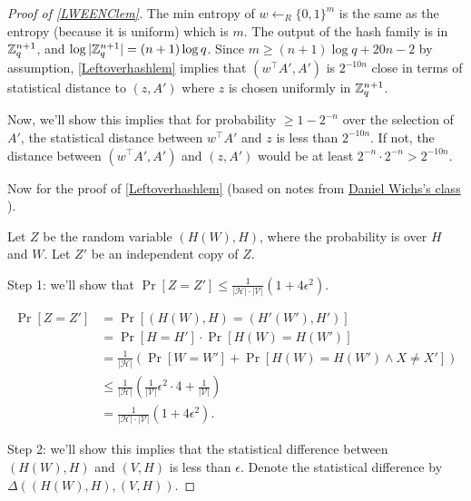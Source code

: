 \begin{proof}[Proof of \cref{LWEENClem}]
The min entropy of \(w\gets_R\{0,1\}^m\) is the same as the entropy
(because it is uniform) which is \(m\). The output of the hash family is
in \({\mathbb{Z}}_q^{n+1}\), and \(\log|{\mathbb{Z}}_q^{n+1}|=(n+1)\log q\). Since
\(m\ge(n+1)\log q+20n-2\) by assumption, \cref{Leftoverhashlem} implies
that \((w^\top A',A')\) is \(2^{-10n}\) close in terms of statistical
distance to \((z,A')\) where \(z\) is chosen uniformly in
\({\mathbb{Z}}_q^{n+1}\).

Now, we'll show this implies that for probability \(\ge 1-2^{-n}\) over
the selection of \(A'\), the statistical distance between \(w^\top A'\)
and \(z\) is less than \(2^{-10n}\). If not, the distance between
\((w^\top A',A')\) and \((z,A')\) would be at least
\(2^{-n}\cdot 2^{-n}>2^{-10n}\).

Now for the proof of \cref{Leftoverhashlem} (based on notes from
\href{http://www.ccs.neu.edu/home/wichs/class/crypto-fall15/}{Daniel
Wichs's class} \cite{wichsnotes}).

Let \(Z\) be the random variable \((H(W),H)\), where the probability is
over \(H\) and \(W\). Let \(Z'\) be an independent copy of \(Z\).

Step 1: we'll show that
\(\Pr[Z=Z']\le\frac{1}{|\mathcal{H}|\cdot|\mathcal{V}|}(1+4\epsilon^2)\).

\begin{equation*}
 \begin{aligned} \Pr[Z=Z']&=\Pr[(H(W),H)=(H'(W'),H')]\\&=\Pr[H=H']\cdot\Pr[H(W)=H(W')]\\&=\frac{1}{|\mathcal{H}|}\left(\Pr[W=W']+\Pr[H(W)=H(W')\wedge X\neq X']\right)\\&\le\frac{1}{|\mathcal{H}|}\left(\frac{1}{|\mathcal{V}|}\epsilon^2\cdot 4+\frac{1}{|\mathcal{V}|}\right)\\&=\frac{1}{|\mathcal{H}|\cdot|\mathcal{V}|}(1+4\epsilon^2).\end{aligned} 
\end{equation*}

Step 2: we'll show this implies that the statistical difference between
\((H(W),H)\) and \((V,H)\) is less than \(\epsilon\). Denote the
statistical difference by \(\Delta((H(W),H),(V,H))\).


\end{proof}

